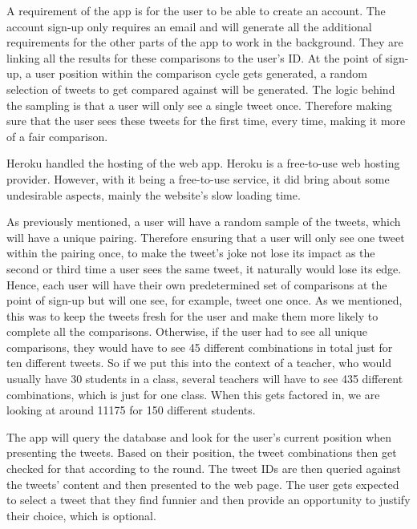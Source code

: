 	A requirement of the app is for the user to be able to create an account. The account sign-up only requires an email and will generate all the additional requirements for the other parts of the app to work in the background. They are linking all the results for these comparisons to the user's ID. At the point of sign-up, a user position within the comparison cycle gets generated, a random selection of tweets to get compared against will be generated. The logic behind the sampling is that a user will only see a single tweet once. Therefore making sure that the user sees these tweets for the first time, every time, making it more of a fair comparison.
	
	Heroku \cite{middleton2013heroku} handled the hosting of the web app. Heroku is a free-to-use web hosting provider. However, with it being a free-to-use service, it did bring about some undesirable aspects, mainly the website's slow loading time.
	
	As previously mentioned, a user will have a random sample of the tweets, which will have a unique pairing. Therefore ensuring that a user will only see one tweet within the pairing once, to make the tweet's joke not lose its impact as the second or third time a user sees the same tweet, it naturally would lose its edge. Hence, each user will have their own predetermined set of comparisons at the point of sign-up but will one see, for example, tweet one once. As we mentioned, this was to keep the tweets fresh for the user and make them more likely to complete all the comparisons. Otherwise, if the user had to see all unique comparisons, they would have to see 45 different combinations in total just for ten different tweets. So if we put this into the context of a teacher, who would usually have 30 students in a class, several teachers will have to see 435 different combinations, which is just for one class. When this gets factored in, we are looking at around 11175 for 150 different students.
	
	The app will query the database and look for the user's current position when presenting the tweets. Based on their position, the tweet combinations then get checked for that according to the round. The tweet IDs are then queried against the tweets' content and then presented to the web page. The user gets expected to select a tweet that they find funnier and then provide an opportunity to justify their choice, which is optional.   
	

